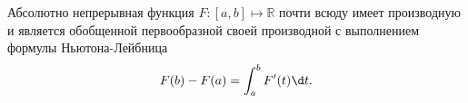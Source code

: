 
\begin{to_thr}
    Абсолютно непрерывная функция $F \colon [a, b] \mapsto \mathbb{R}$ почти всюду имеет производную и является обобщенной первообразной своей производной с выполнением формулы Ньютона-Лейбница
    \begin{equation*}
        F(b) - F(a) = \int_a^b F' (t) \d t.
    \end{equation*}
\end{to_thr}

\noindent
{}

